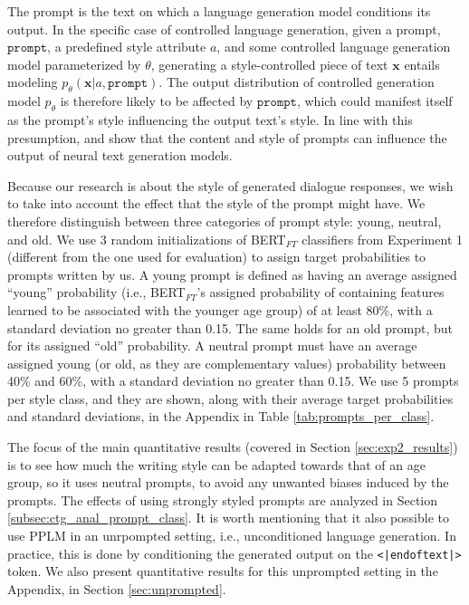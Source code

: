 


The prompt is the text on which a language generation model conditions its output. In the specific case of controlled language generation, given a prompt, $\texttt{prompt}$, a predefined style attribute $a$, and some controlled language generation model parameterized by $\theta$, generating a style-controlled piece of text $\textbf{x}$ entails modeling $p_{\theta}(\textbf{x} | a, \texttt{prompt})$. The output distribution of controlled generation model $p_{\theta}$ is therefore likely to be affected by $\texttt{prompt}$, which could manifest itself as the prompt's style influencing the output text's style. In line with this presumption, \cite{fan-etal-2018-hierarchical} and \cite{lester2021power} show that the content and style of prompts can influence the output of neural text generation models. 

Because our research is about the style of generated dialogue responses, we wish to take into account the effect that the style of the prompt might have. We therefore distinguish between three categories of prompt style: young, neutral, and old. We use 3 random initializations of BERT$_{FT}$ classifiers from Experiment 1 (different from the one used for evaluation) to assign target probabilities to prompts written by us. A young prompt is defined as having an average assigned ``young'' probability (i.e., BERT$_{FT}$'s assigned probability of containing features learned to be associated with the younger age group) of at least 80\%, with a standard deviation no greater than 0.15. The same holds for an old prompt, but for its assigned ``old'' probability. A neutral prompt must have an average assigned young (or old, as they are complementary values) probability between 40\% and 60\%, with a standard deviation no greater than 0.15. We use 5 prompts per style class, and they are shown, along with their average target probabilities and standard deviations, in the Appendix in Table \ref{tab:prompts_per_class}. 

The focus of the main quantitative results (covered in Section \ref{sec:exp2_results}) is to see how much the writing style can be adapted towards that of an age group, so it uses neutral prompts, to avoid any unwanted biases induced by the prompts. The effects of using strongly styled prompts are analyzed in Section \ref{subsec:ctg_anal_prompt_class}. It is worth mentioning that it also possible to use PPLM in an unrpompted setting, i.e., unconditioned language generation. In practice, this is done by conditioning the generated output on the \texttt{<|endoftext|>} token. We also present quantitative results for this unprompted setting in the Appendix, in Section \ref{sec:unprompted}.

